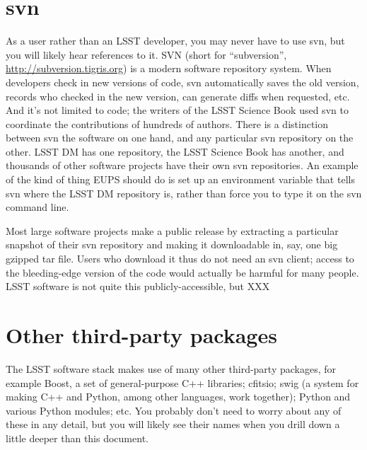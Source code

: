 \documentclass{book}
\begin{document}
\section{svn}

As a user rather than an LSST developer, you may never have to use
svn, but you will likely hear references to it.  SVN (short for
``subversion'', \url{http://subversion.tigris.org}) is a modern
software repository system.  When developers check in new versions of
code, svn automatically saves the old version, records who checked in
the new version, can generate diffs when requested, etc.  And it's not
limited to code; the writers of the LSST Science Book used svn to
coordinate the contributions of hundreds of authors.  There is a
distinction between svn the software on one hand, and any particular
svn repository on the other.  LSST DM has one repository, the LSST
Science Book has another, and thousands of other software projects
have their own svn repositories.  An example of the kind of thing EUPS
should do is set up an environment variable that tells svn where the
LSST DM repository is, rather than force you to type it on the svn
command line.

Most large software projects make a public release by extracting a
particular snapshot of their svn repository and making it downloadable
in, say, one big gzipped tar file.  Users who download it thus do not
need an svn client; access to the bleeding-edge version of the code
would actually be harmful for many people.  LSST software is not quite
this publicly-accessible, but XXX

\section{Other third-party packages}

The LSST software stack makes use of many other third-party packages,
for example Boost, a set of general-purpose C++ libraries; cfitsio;
swig (a system for making C++ and Python, among other languages, work
together); Python and various Python modules; etc.  You probably don't
need to worry about any of these in any detail, but you will likely
see their names when you drill down a little deeper than this
document.

\end{document}
